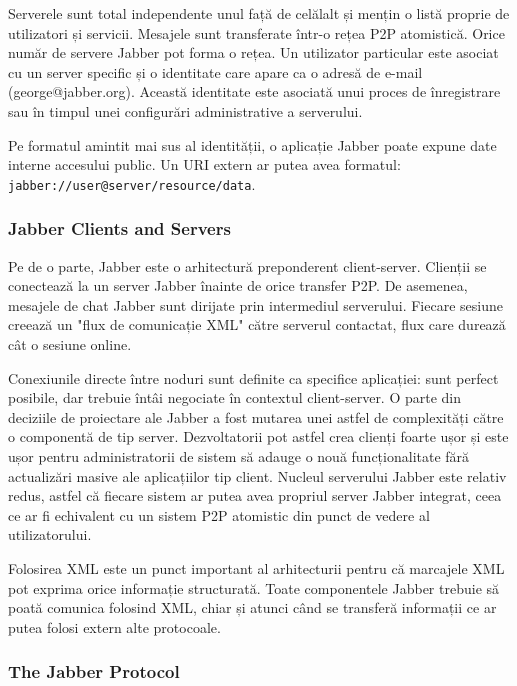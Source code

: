 Serverele sunt total independente unul față de celălalt și mențin o listă
proprie de utilizatori și servicii. Mesajele sunt transferate într-o rețea P2P
atomistică. Orice număr de servere Jabber pot forma o rețea. Un utilizator
particular este asociat cu un server specific și o identitate care apare ca o
adresă de e-mail (george@jabber.org).  Această identitate este asociată unui
proces de înregistrare sau în timpul unei configurări administrative a
serverului.

Pe formatul amintit mai sus al identității, o aplicație Jabber poate expune
date interne accesului public. Un URI extern ar putea avea formatul:
\texttt{jabber://user@server/resource/data}.

\subsubsection{Jabber Clients and Servers}

Pe de o parte, Jabber este o arhitectură preponderent client-server. Clienții
se conectează la un server Jabber înainte de orice transfer P2P. De asemenea,
mesajele de chat Jabber sunt dirijate prin intermediul serverului. Fiecare
sesiune creează un "flux de comunicație XML" către serverul contactat, flux
care durează cât o sesiune online.

Conexiunile directe între noduri sunt definite ca specifice aplicației: sunt
perfect posibile, dar trebuie întâi negociate în contextul client-server. O
parte din deciziile de proiectare ale Jabber a fost mutarea unei astfel de
complexități către o componentă de tip server. Dezvoltatorii pot astfel crea
clienți foarte ușor și este ușor pentru administratorii de sistem să adauge o
nouă funcționalitate fără actualizări masive ale aplicațiilor tip client.
Nucleul serverului Jabber este relativ redus, astfel că fiecare sistem ar
putea avea propriul server Jabber integrat, ceea ce ar fi echivalent cu un
sistem P2P atomistic din punct de vedere al utilizatorului.

Folosirea XML este un punct important al arhitecturii pentru că marcajele XML
pot exprima orice informație structurată. Toate componentele Jabber trebuie să
poată comunica folosind XML, chiar și atunci când se transferă informații ce
ar putea folosi extern alte protocoale.

\subsubsection{The Jabber Protocol}

